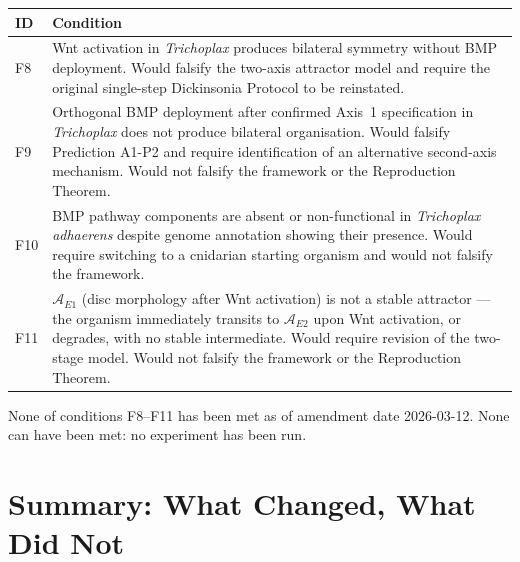 \documentclass[12pt, a4paper]{article}
\theoremstyle{definition}
\theoremstyle{remark}
\begin{document}
\begin{center}
\begin{tabularx}{\textwidth}{lX}
\toprule
\textbf{ID} & \textbf{Condition} \\
\midrule
F8 & Wnt activation in \textit{Trichoplax} produces
bilateral symmetry without BMP deployment. Would falsify
the two-axis attractor model and require the original
single-step Dickinsonia Protocol to be reinstated.
\\[0.4em]
F9 & Orthogonal BMP deployment after confirmed Axis~1
specification in \textit{Trichoplax} does not produce
bilateral organisation. Would falsify Prediction A1-P2
and require identification of an alternative second-axis
mechanism. Would not falsify the framework or the
Reproduction Theorem.
\\[0.4em]
F10 & BMP pathway components are absent or non-functional
in \textit{Trichoplax adhaerens} despite genome annotation
showing their presence. Would require switching to a
cnidarian starting organism and would not falsify the
framework.
\\[0.4em]
F11 & $\mathcal{A}_{E1}$ (disc morphology after Wnt
activation) is not a stable attractor --- the organism
immediately transits to $\mathcal{A}_{E2}$ upon Wnt
activation, or degrades, with no stable intermediate.
Would require revision of the two-stage model. Would not
falsify the framework or the Reproduction Theorem.
\\
\bottomrule
\end{tabularx}
\end{center}

\noindent None of conditions F8--F11 has been met as of
amendment date 2026-03-12. None can have been met: no
experiment has been run.

\section{Summary: What Changed, What Did Not}
\end{document}
